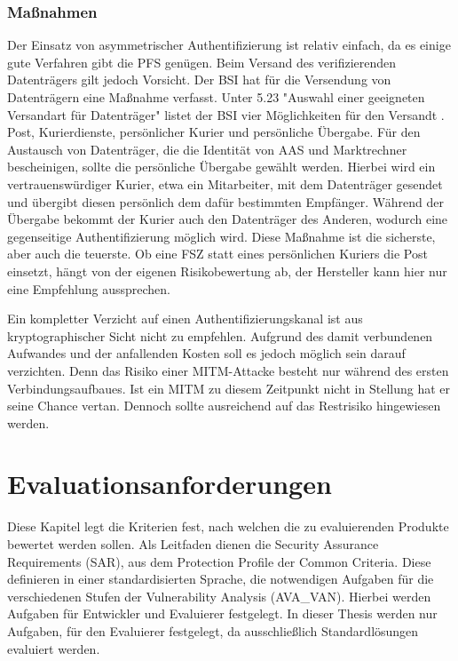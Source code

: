\documentclass[11pt,a4paper]{report}
\begin{document}
\subsection{Maßnahmen}

Der Einsatz von asymmetrischer Authentifizierung ist relativ einfach, da es einige gute Verfahren gibt die PFS genügen. Beim Versand des verifizierenden Datenträgers gilt jedoch Vorsicht. Der BSI hat für die Versendung von Datenträgern eine Maßnahme verfasst. Unter 5.23 "Auswahl einer geeigneten Versandart für Datenträger" listet der BSI vier Möglichkeiten für den Versandt \cite{bsi_m5023}. Post, Kurierdienste, persönlicher Kurier und persönliche Übergabe. Für den Austausch von Datenträger, die die Identität von AAS und Marktrechner bescheinigen, sollte die persönliche Übergabe gewählt werden. Hierbei wird ein vertrauenswürdiger Kurier, etwa ein Mitarbeiter, mit dem Datenträger gesendet und übergibt diesen persönlich dem dafür bestimmten Empfänger. Während der Übergabe bekommt der Kurier auch den Datenträger des Anderen, wodurch eine gegenseitige Authentifizierung möglich wird. Diese Maßnahme ist die sicherste, aber auch die teuerste. Ob eine FSZ statt eines persönlichen Kuriers die Post einsetzt, hängt von der eigenen Risikobewertung ab, der Hersteller kann hier nur eine Empfehlung aussprechen.

Ein kompletter Verzicht auf einen Authentifizierungskanal ist aus kryptographischer Sicht nicht zu empfehlen. Aufgrund des damit verbundenen Aufwandes und der anfallenden Kosten soll es jedoch  möglich sein darauf verzichten. Denn das Risiko einer MITM-Attacke besteht nur während des ersten Verbindungsaufbaues. Ist ein MITM zu diesem Zeitpunkt nicht in Stellung hat er seine Chance vertan. Dennoch sollte ausreichend auf das Restrisiko hingewiesen werden.

\chapter{Evaluationsanforderungen} \label{chap:eval_req}

Diese Kapitel legt die Kriterien fest, nach welchen die zu evaluierenden Produkte bewertet werden sollen. Als Leitfaden dienen die Security Assurance Requirements (SAR), aus dem Protection Profile der Common Criteria. Diese definieren in einer standardisierten Sprache, die notwendigen Aufgaben für die verschiedenen Stufen der Vulnerability Analysis (AVA\_VAN). Hierbei werden Aufgaben für Entwickler und Evaluierer festgelegt. In dieser Thesis werden nur Aufgaben, für den Evaluierer festgelegt, da ausschließlich Standardlösungen evaluiert werden.
\end{document}
